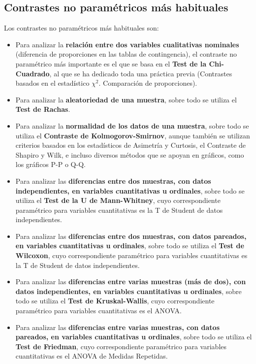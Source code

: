 \subsection{Contrastes no paramétricos más habituales}
Los contrastes no paramétricos más habituales son:
\begin{itemize}
\item Para analizar la \textbf{relación entre dos variables cualitativas nominales} (diferencia de proporciones en las tablas de
contingencia), el contraste no paramétrico más importante es el que se basa en el \textbf{Test de la Chi-Cuadrado}, al que se ha dedicado
toda una práctica previa (Contrastes basados en el estadístico $\chi^2$. Comparación de proporciones).

\item Para analizar la \textbf{aleatoriedad de una muestra}, sobre todo se utiliza el \textbf{Test de Rachas}.

\item Para analizar la \textbf{normalidad de los datos de una muestra}, sobre todo se utiliza el \textbf{Contraste de Kolmogorov-Smirnov},
aunque también se utilizan criterios basados en los estadísticos de Asimetría y Curtosis, el Contraste de Shapiro y Wilk, e incluso diversos
métodos que se apoyan en gráficos, como los gráficos P-P o Q-Q.

\item Para analizar las \textbf{diferencias entre dos muestras, con datos independientes, en variables cuantitativas u ordinales}, sobre
todo se utiliza el \textbf{Test de la U de Mann-Whitney}, cuyo correspondiente paramétrico para variables cuantitativas es la T de Student
de datos independientes.

\item Para analizar las \textbf{diferencias entre dos muestras, con datos pareados, en variables cuantitativas u ordinales}, sobre todo se
utiliza el \textbf{Test de Wilcoxon}, cuyo correspondiente paramétrico para variables cuantitativas es la T de Student de datos
independientes.

\item Para analizar las \textbf{diferencias entre varias muestras (más de dos), con datos independientes, en variables cuantitativas u
ordinales}, sobre todo se utiliza el \textbf{Test de Kruskal-Wallis}, cuyo correspondiente paramétrico para variables cuantitativas es el
ANOVA.

\item Para analizar las \textbf{diferencias entre varias muestras, con datos pareados, en variables cuantitativas u ordinales}, sobre todo
se utiliza el \textbf{Test de Friedman}, cuyo correspondiente paramétrico para variables cuantitativas es el ANOVA de Medidas Repetidas.


\end{itemize}
